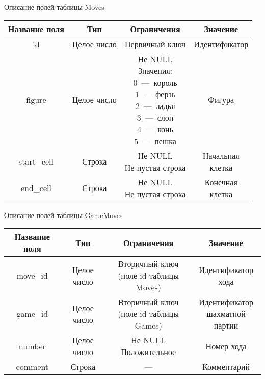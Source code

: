 \begin{center}
	\begin{threeparttable}
		\captionsetup{justification=raggedright,singlelinecheck=off}
		\caption{\label{moves_table}Описание полей таблицы Moves}
		\centering
		\begin{tabular}{|c|c|c|c|}
			\hline
			Название поля & Тип & Ограничения & Значение \\
			\hline
			id & Целое число & Первичный ключ & Идентификатор \\
			\hline
			figure & Целое число & \specialcell{Не NULL\\Значения:\\0~---~король\\1~---~ферзь\\2~---~ладья\\3~---~слон\\4~---~конь\\5~---~пешка} & Фигура\\
			\hline
			start\_cell & Строка & \specialcell{Не NULL\\Не пустая строка} & \specialcell{Начальная\\клетка} \\
			\hline
			end\_cell & Строка & \specialcell{Не NULL\\Не пустая строка} & \specialcell{Конечная\\клетка} \\
			\hline
		\end{tabular}
	\end{threeparttable}
\end{center}
\begin{center}
	\begin{threeparttable}
		\captionsetup{justification=raggedright,singlelinecheck=off}
		\caption{\label{gamemoves_table}Описание полей таблицы GameMoves}
		\centering
		\begin{tabular}{|c|c|c|c|}
			\hline
			Название поля & Тип & Ограничения & Значение \\
			\hline
			move\_id & Целое число & \specialcell{Вторичный ключ\\(поле id таблицы Moves)} & \specialcell{Идентификатор\\хода} \\
			\hline
			game\_id & Целое число & \specialcell{Вторичный ключ\\(поле id таблицы Games)} & \specialcell{Идентификатор\\шахматной партии} \\
			\hline
			number & Целое число & \specialcell{Не NULL\\Положительное} & Номер хода \\
			\hline
			comment & Строка & --- & Комментарий \\
			\hline
		\end{tabular}
	\end{threeparttable}
\end{center}

